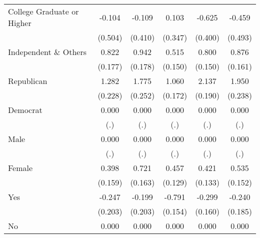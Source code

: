 \begin{table}[htbp]
\begin{tabular}{l*{5}{c}}
College Graduate or Higher&      -0.104         &      -0.109         &       0.103         &      -0.625         &      -0.459         \\
                    &     (0.504)         &     (0.410)         &     (0.347)         &     (0.400)         &     (0.493)         \\
Independent \& Others&       0.822\sym{***}&       0.942\sym{***}&       0.515\sym{***}&       0.800\sym{***}&       0.876\sym{***}\\
                    &     (0.177)         &     (0.178)         &     (0.150)         &     (0.150)         &     (0.161)         \\
Republican          &       1.282\sym{***}&       1.775\sym{***}&       1.060\sym{***}&       2.137\sym{***}&       1.950\sym{***}\\
                    &     (0.228)         &     (0.252)         &     (0.172)         &     (0.190)         &     (0.238)         \\
Democrat            &       0.000         &       0.000         &       0.000         &       0.000         &       0.000         \\
                    &         (.)         &         (.)         &         (.)         &         (.)         &         (.)         \\
Male                &       0.000         &       0.000         &       0.000         &       0.000         &       0.000         \\
                    &         (.)         &         (.)         &         (.)         &         (.)         &         (.)         \\
Female              &       0.398\sym{**} &       0.721\sym{***}&       0.457\sym{***}&       0.421\sym{***}&       0.535\sym{***}\\
                    &     (0.159)         &     (0.163)         &     (0.129)         &     (0.133)         &     (0.152)         \\
Yes                 &      -0.247         &      -0.199         &      -0.791\sym{***}&      -0.299\sym{*}  &      -0.240         \\
                    &     (0.203)         &     (0.203)         &     (0.154)         &     (0.160)         &     (0.185)         \\
No                  &       0.000         &       0.000         &       0.000         &       0.000         &       0.000         \\

\end{tabular}
\end{table}
